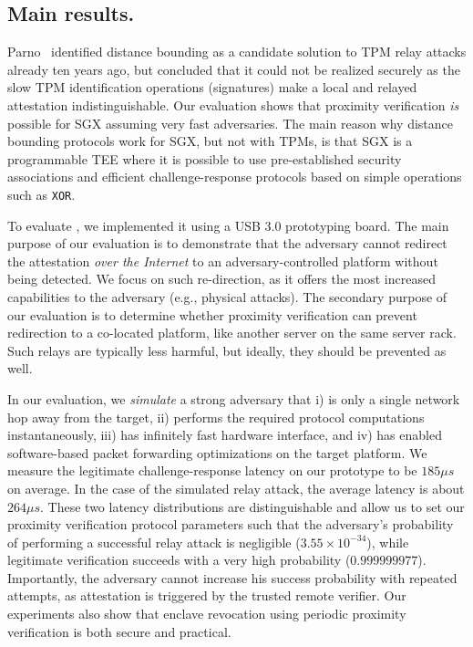 \subsection{Main results.} Parno~\cite{parno2008bootstrapping} identified distance bounding as a candidate solution to TPM relay attacks already ten years ago, but concluded that it could not be realized securely as the slow TPM identification operations (signatures) make a local and relayed attestation indistinguishable. Our evaluation shows that proximity verification \emph{is} possible for SGX assuming very fast adversaries. The main reason why distance bounding protocols work for SGX, but not with TPMs, is that SGX is a programmable TEE where it is possible to use pre-established security associations and efficient challenge-response protocols based on simple operations such as \texttt{XOR}.

To evaluate \name, we implemented it using a USB 3.0 prototyping board. The main purpose of our evaluation is to demonstrate that the adversary cannot redirect the attestation \emph{over the Internet} to an adversary-controlled platform without being detected. We focus on such re-direction, as it offers the most increased capabilities to the adversary (e.g., physical attacks). The secondary purpose of our evaluation is to determine whether proximity verification can prevent redirection to a co-located platform, like another server on the same server rack. Such relays are typically less harmful, but ideally, they should be prevented as well.



In our evaluation, we \emph{simulate} a strong adversary that i) is only a single network hop away from the target, ii) performs the required protocol computations instantaneously, iii) has infinitely fast hardware interface, and iv) has enabled software-based packet forwarding optimizations on the target platform. We measure the legitimate challenge-response latency on our prototype to be $185 \mu s$ on average. In the case of the simulated relay attack, the average latency is about $264 \mu s$. These two latency distributions are distinguishable and allow us to set our proximity verification protocol parameters such that the adversary's probability of performing a successful relay attack is negligible ($3.55\times 10^{-34}$), while legitimate verification succeeds with a very high probability ($0.999999977$). Importantly, the adversary cannot increase his success probability with repeated attempts, as attestation is triggered by the trusted remote verifier. Our experiments also show that enclave revocation using periodic proximity verification is both secure and practical.


